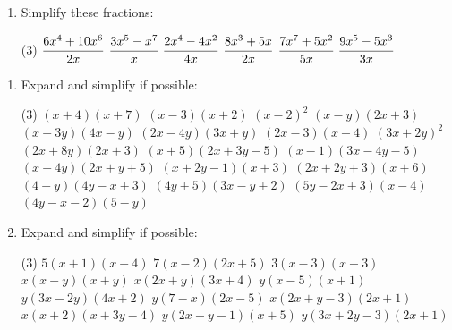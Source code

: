 \documentclass[fleqn, twoside]{article}
\begin{document}
\begin{enumerate}
    \vspace{4mm}
    \item Simplify these fractions:
        \begin{tasks}(3) %
            \task $\cfrac{6x^4+10x^6}{2x}$            %
            \task $\cfrac{3x^5-x^7}{x}$               %
            \task $\cfrac{2x^4-4x^2}{4x}$             %
            \task $\cfrac{8x^3+5x}{2x}$               %
            \task $\cfrac{7x^7+5x^2}{5x}$             %
            \task $\cfrac{9x^5-5x^3}{3x}$             %
        \end{tasks}
\end{enumerate}



\exercise{}
\begin{enumerate}
    \item Expand and simplify if possible:
        \begin{tasks}(3) %
            \task $(x+4)(x+7)$            %
            \task $(x-3)(x+2)$            %
            \task $(x-2)^2$               %
            \task $(x-y)(2x+3)$           %
            \task $(x+3y)(4x-y)$          %
            \task $(2x-4y)(3x+y)$         %
            \task $(2x-3)(x-4)$           %
            \task $(3x+2y)^2$             %
            \task $(2x+8y)(2x+3)$         %
            \task $(x+5)(2x+3y-5)$        %
            \task $(x-1)(3x-4y-5)$        %
            \task $(x-4y)(2x+y+5)$        %
            \task $(x+2y-1)(x+3)$         %
            \task $(2x+2y+3)(x+6)$        %
            \task $(4-y)(4y-x+3)$         %
            \task $(4y+5)(3x-y+2)$        %
            \task $(5y-2x+3)(x-4)$        %
            \task $(4y-x-2)(5-y)$         %
        \end{tasks}
    \newpage
    \item Expand and simplify if possible:
        \begin{tasks}(3) %
            \task $5(x+1)(x-4)$           %
            \task $7(x-2)(2x+5)$          %
            \task $3(x-3)(x-3)$           %
            \task $x(x-y)(x+y)$           %
            \task $x(2x+y)(3x+4)$         %
            \task $y(x-5)(x+1)$           %
            \task $y(3x-2y)(4x+2)$        %
            \task $y(7-x)(2x-5)$          %
            \task $x(2x+y-3)(2x+1)$       %
            \task $x(x+2)(x+3y-4)$        %
            \task $y(2x+y-1)(x+5)$        %
            \task $y(3x+2y-3)(2x+1)$      %

\end{tasks}
\end{enumerate}
\end{document}
